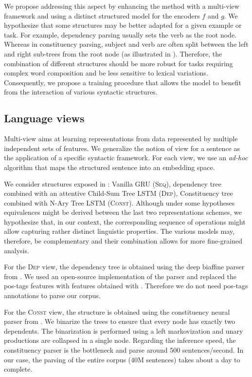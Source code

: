 We propose addressing this aspect by enhancing the method with a multi-view framework and using a distinct structured model for the encoders $f$ and $g$. We hypothesize that some structures may be better adapted for a given example or task. 
For example, dependency parsing usually sets the verb as the root node. Whereas in constituency parsing, subject and verb are often split between the left and right sub-trees from the root node (as illustrated in ). Therefore, the combination of different structures should be more robust for tasks requiring complex word composition and be less sensitive to lexical variations. Consequently, we propose a training procedure that allows the model to benefit from the interaction of various syntactic structures.
\subsection{Language views}

Multi-view aims at learning representations from data represented by multiple independent sets of features. We generalize the notion of view for a sentence as the application of a specific syntactic framework. For each view, we use an \textit{ad-hoc} algorithm that maps the structured sentence into an embedding space.

We consider structures exposed in : Vanilla GRU (\textsc{Seq}), dependency tree combined with an attentive Child-Sum Tree LSTM (\textsc{Dep}), Constituency tree combined with N-Ary Tree LSTM (\textsc{Const}). Although under some hypotheses equivalences might be derived between the last two representations schemes, we hypothesize that, in our context, the corresponding sequence of operations might allow capturing rather distinct linguistic properties. The various models may, therefore, be complementary and their combination allows for more fine-grained analysis. 

For the \textsc{Dep} view, the dependency tree is obtained using the deep biaffine parser from \textcite{dozat_17}. We used an open-source implementation of the parser and replaced the pos-tags features with features obtained with \bert. Therefore we do not need pos-tags annotations to parse our corpus. 

For the \textsc{Const} view, the structure is obtained using the constituency neural parser from \textcite{klein_18}. We binarize the trees to ensure that every node has exactly two dependents. The binarization is performed using a left markovization \parencite{klein_2003} and unary productions are collapsed in a single node. Regarding the inference speed, the constituency parser is the bottleneck and parse around 500 sentences/second. In our case, the parsing of the entire corpus (40M sentences) takes about a day to complete.

